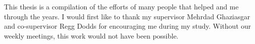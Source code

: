 

This thesis is a compilation of the efforts of many people that helped and
me through the years. I would first like to thank my supervisor Mehrdad Ghaziasgar and co-supervisor Regg Dodds for encouraging me during my study. Without our weekly meetings, this work
would not have been possible. 

